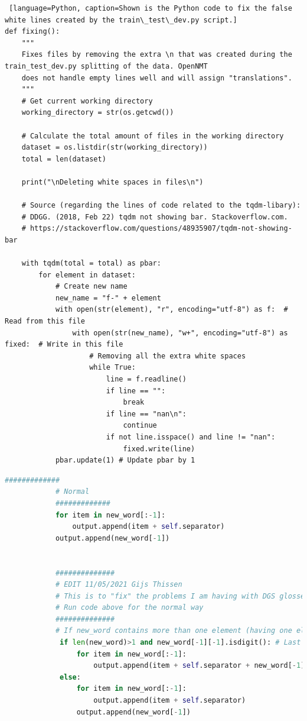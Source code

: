 \begin{lstlisting} [language=Python, caption=Shown is the Python code to fix the false white lines created by the train\_test\_dev.py script.]
def fixing():
    """
    Fixes files by removing the extra \n that was created during the train_test_dev.py splitting of the data. OpenNMT
    does not handle empty lines well and will assign "translations".
    """
    # Get current working directory
    working_directory = str(os.getcwd())

    # Calculate the total amount of files in the working directory
    dataset = os.listdir(str(working_directory))
    total = len(dataset)

    print("\nDeleting white spaces in files\n")

    # Source (regarding the lines of code related to the tqdm-libary):
    # DDGG. (2018, Feb 22) tqdm not showing bar. Stackoverflow.com.
    # https://stackoverflow.com/questions/48935907/tqdm-not-showing-bar

    with tqdm(total = total) as pbar:
        for element in dataset:
            # Create new name
            new_name = "f-" + element
            with open(str(element), "r", encoding="utf-8") as f:  # Read from this file
                with open(str(new_name), "w+", encoding="utf-8") as fixed:  # Write in this file
                    # Removing all the extra white spaces
                    while True:
                        line = f.readline()
                        if line == "":
                            break
                        if line == "nan\n":
                            continue
                        if not line.isspace() and line != "nan":
                            fixed.write(line)
            pbar.update(1) # Update pbar by 1
\end{lstlisting}

 \label{apx:bpemod}
\begin{lstlisting}[language=Python, caption=Shown is the Python code that is a modification to the normal Byte Pair Encoding algorithm.]
            #############
            # Normal
            #############
            for item in new_word[:-1]:
                output.append(item + self.separator)
            output.append(new_word[-1])


            ##############
            # EDIT 11/05/2021 Gijs Thissen
            # This is to "fix" the problems I am having with DGS glosses with features that get split up
            # Run code above for the normal way
            ##############
            # If new_word contains more than one element (having one element suggest there not being a temporal feature)
             if len(new_word)>1 and new_word[-1][-1].isdigit(): # Last element of last element of new_word is digit
                 for item in new_word[:-1]:
                     output.append(item + self.separator + new_word[-1])
             else:
                 for item in new_word[:-1]:
                     output.append(item + self.separator)
                 output.append(new_word[-1])
\end{lstlisting}